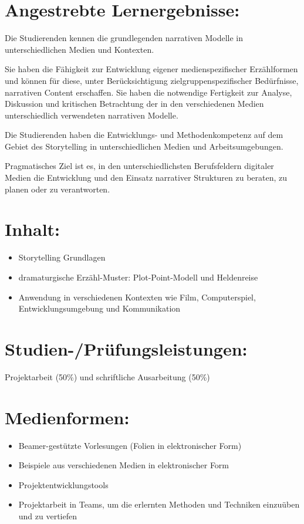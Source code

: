 \section*{Angestrebte
Lernergebnisse:}\label{angestrebte-lernergebnisse-17}

Die Studierenden kennen die grundlegenden narrativen Modelle in
unterschiedlichen Medien und Kontexten.

Sie haben die Fähigkeit zur Entwicklung eigener medienspezifischer
Erzählformen und können für diese, unter Berücksichtigung
zielgruppenspezifischer Bedürfnisse, narrativen Content erschaffen. Sie
haben die notwendige Fertigkeit zur Analyse, Diskussion und kritischen
Betrachtung der in den verschiedenen Medien unterschiedlich verwendeten
narrativen Modelle.

Die Studierenden haben die Entwicklungs- und Methodenkompetenz auf dem
Gebiet des Storytelling in unterschiedlichen Medien und
Arbeitsumgebungen.

Pragmatisches Ziel ist es, in den unterschiedlichsten Berufsfeldern
digitaler Medien die Entwicklung und den Einsatz narrativer Strukturen
zu beraten, zu planen oder zu verantworten.

\section*{Inhalt:}\label{inhalt-17}

\begin{itemize}
\tightlist
\item
  Storytelling Grundlagen
\item
  dramaturgische Erzähl-Muster: Plot-Point-Modell und Heldenreise
\item
  Anwendung in verschiedenen Kontexten wie Film, Computerspiel,
  Entwicklungsumgebung und Kommunikation
\end{itemize}

\section*{Studien-/Prüfungsleistungen:}\label{studien-pruxfcfungsleistungen-17}

Projektarbeit (50\%) und schriftliche Ausarbeitung (50\%)

\section*{Medienformen:}\label{medienformen-17}

\begin{itemize}
\tightlist
\item
  Beamer-gestützte Vorlesungen (Folien in elektronischer Form)
\item
  Beispiele aus verschiedenen Medien in elektronischer Form
\item
  Projektentwicklungstools
\item
  Projektarbeit in Teams, um die erlernten Methoden und Techniken
  einzuüben und zu vertiefen
\end{itemize}

